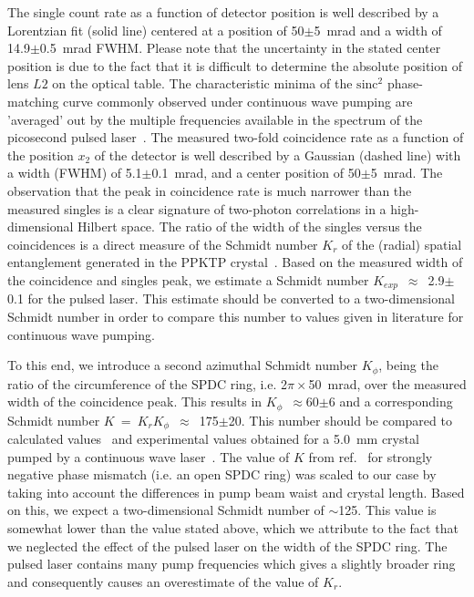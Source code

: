 The single count rate as a function of detector position is well described by a Lorentzian fit (solid line) centered at a position of 50$\pm$5~mrad and a width of 14.9$\pm$0.5~mrad FWHM. Please note that the uncertainty in the stated center position is due to the fact that it is difficult to determine the absolute position of lens $L2$ on the optical table. The characteristic minima of the $\mathrm{sinc}^2$ phase-matching curve commonly observed under continuous wave pumping are 'averaged' out by the multiple frequencies available in the spectrum of the picosecond pulsed laser~\cite{Keller1997}. The measured two-fold coincidence rate as a function of the position $x_2$ of the detector is well described by a Gaussian (dashed line) with a width (FWHM) of 5.1$\pm$0.1~mrad, and a center position of 50$\pm$5~mrad. The observation that the peak in coincidence rate is much narrower than the measured singles is a clear signature of two-photon correlations in a high-dimensional Hilbert space. The ratio of the width of the singles versus the coincidences is a direct measure of the Schmidt number $K_r$ of the (radial) spatial entanglement generated in the PPKTP crystal~\cite{DiLorenzoPires2009}. Based on the measured width of the coincidence and singles peak, we estimate a Schmidt number $K_{exp}$~$\approx$~2.9$\pm$0.1 for the pulsed laser. This estimate should be converted to a two-dimensional Schmidt number in order to compare this number to values given in literature for continuous wave pumping.

To this end, we introduce a second azimuthal Schmidt number $K_\phi$, being the ratio of the circumference of the SPDC ring, i.e. 2$\pi \times$50~mrad, over the measured width of the coincidence peak. This results in $K_\phi$~$\approx$60$\pm$6 and a corresponding Schmidt number $K$~=~$K_r K_\phi$~$\approx$~175$\pm$20. This number should be compared to calculated values~\cite{Law2004} and experimental values obtained for a 5.0~mm crystal pumped by a continuous wave laser~\cite{DiLorenzoPires2009}. The value of $K$ from ref.~\cite{DiLorenzoPires2009} for strongly negative phase mismatch (i.e. an open SPDC ring) was scaled to our case by taking into account the differences in pump beam waist and crystal length. Based on this, we expect a two-dimensional Schmidt number of $\sim$125. This value is somewhat lower than the value stated above, which we attribute to the fact that we neglected the effect of the pulsed laser on the width of the SPDC ring. The pulsed laser contains many pump frequencies which gives a slightly broader ring and consequently causes an overestimate of the value of $K_r$.

